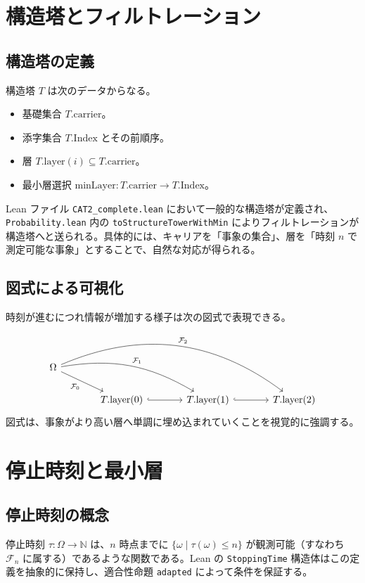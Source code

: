 \documentclass[12pt]{ltjsarticle}
\begin{document}
\section{構造塔とフィルトレーション}
\subsection{構造塔の定義}
構造塔 $T$ は次のデータからなる。
\begin{itemize}
  \item 基礎集合 $T.\mathrm{carrier}$。
  \item 添字集合 $T.\mathrm{Index}$ とその前順序。
  \item 層 $T.\mathrm{layer}(i) \subseteq T.\mathrm{carrier}$。
  \item 最小層選択 $\mathrm{minLayer} : T.\mathrm{carrier} \to T.\mathrm{Index}$。
\end{itemize}
Lean ファイル \texttt{CAT2\_complete.lean} において一般的な構造塔が定義され、\texttt{Probability.lean} 内の \texttt{toStructureTowerWithMin} によりフィルトレーションが構造塔へと送られる。具体的には、キャリアを「事象の集合」、層を「時刻 $n$ で測定可能な事象」とすることで、自然な対応が得られる。

\subsection{図式による可視化}
時刻が進むにつれ情報が増加する様子は次の図式で表現できる。
\[
  \begin{tikzcd}[column sep=large]
    \Omega \arrow[dr, "\mathcal{F}_0"'] \arrow[drr, bend left=20, "\mathcal{F}_1"] \arrow[drrr, bend left=30, "\mathcal{F}_2"] & & & \\
    & T.\mathrm{layer}(0) \arrow[r, hook] & T.\mathrm{layer}(1) \arrow[r, hook] & T.\mathrm{layer}(2)
  \end{tikzcd}
\]
図式は、事象がより高い層へ単調に埋め込まれていくことを視覚的に強調する。

\section{停止時刻と最小層}
\subsection{停止時刻の概念}
停止時刻 $\tau : \Omega \to \mathbb{N}$ は、$n$ 時点までに $\{\omega \mid \tau(\omega) \leq n\}$ が観測可能（すなわち $\mathcal{F}_n$ に属する）であるような関数である。Lean の \texttt{StoppingTime} 構造体はこの定義を抽象的に保持し、適合性命題 \texttt{adapted} によって条件を保証する。
\end{document}

